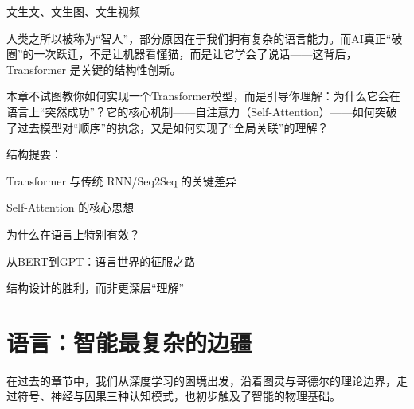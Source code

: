 %
%
文生文、文生图、文生视频




人类之所以被称为“智人”，部分原因在于我们拥有复杂的语言能力。而AI真正“破圈”的一次跃迁，不是让机器看懂猫，而是让它学会了说话——这背后，Transformer 是关键的结构性创新。

本章不试图教你如何实现一个Transformer模型，而是引导你理解：为什么它会在语言上“突然成功”？它的核心机制——自注意力（Self-Attention）——如何突破了过去模型对“顺序”的执念，又是如何实现了“全局关联”的理解？

结构提要：

Transformer 与传统 RNN/Seq2Seq 的关键差异

Self-Attention 的核心思想

为什么在语言上特别有效？

从BERT到GPT：语言世界的征服之路

结构设计的胜利，而非更深层“理解”


\section*{语言：智能最复杂的边疆}

在过去的章节中，我们从深度学习的困境出发，沿着图灵与哥德尔的理论边界，走过符号、神经与因果三种认知模式，也初步触及了智能的物理基础。

